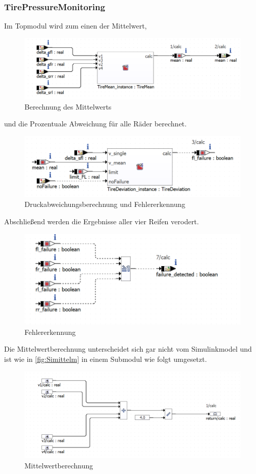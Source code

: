 \subsubsection{TirePressureMonitoring}
Im Topmodul wird zum einen der Mittelwert,
\begin{figure}[H]
	\centering
	\includegraphics[width=0.7\linewidth]{../Graphiken/mean}
	\caption{Berechnung des Mittelwerts}
	\label{fig:Simittelm}
\end{figure}
und die Prozentuale Abweichung für alle Räder berechnet.
\begin{figure}[H]
	\centering
	\includegraphics[width=0.7\linewidth]{../Graphiken/deviation}
	\caption{Druckabweichungsberechnung und Fehlererkennung}
	\label{fig:abweichung}
\end{figure}
Abschließend werden die Ergebnisse aller vier Reifen verodert.
\begin{figure}[H]
	\centering
	\includegraphics[width=0.7\linewidth]{../Graphiken/or}
	\caption{Fehlererkennung}
	\label{fig:fehler}
\end{figure}
Die Mittelwertberechnung unterscheidet sich gar nicht vom Simulinkmodel und ist wie in \autoref{fig:Simittelm} in einem Submodul wie folgt umgesetzt.
\begin{figure}[H]
	\centering
	\includegraphics[width=0.8\linewidth]{../Graphiken/meanCalc}
	\caption{Mittelwertberechnung}
	\label{fig:mittel}
\end{figure}
